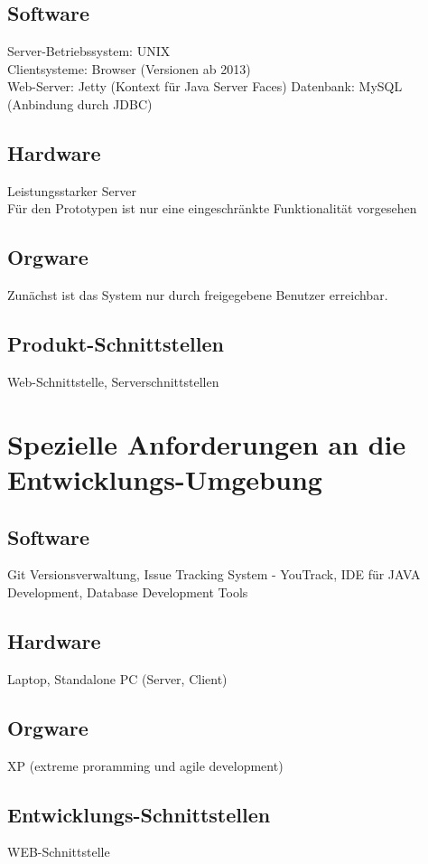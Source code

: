		\subsection{Software}
		Server-Betriebssystem: UNIX\\
		Clientsysteme: Browser (Versionen ab 2013)\\
		Web-Server: Jetty (Kontext für Java Server Faces)
		Datenbank: MySQL (Anbindung durch JDBC)
		
		\subsection{Hardware}
		Leistungsstarker Server\\
		Für den Prototypen ist nur eine eingeschränkte Funktionalität vorgesehen
		
		\subsection{Orgware}
		
		Zunächst ist das System nur durch freigegebene Benutzer erreichbar.		

		\subsection{Produkt-Schnittstellen}
		
		Web-Schnittstelle, Serverschnittstellen
		
	\section{Spezielle Anforderungen an die Entwicklungs-Umgebung}
		\subsection{Software}
		Git Versionsverwaltung, Issue Tracking System - YouTrack, IDE für JAVA Development, Database Development Tools
		
		\subsection{Hardware}
		Laptop, Standalone PC (Server, Client)
		\subsection{Orgware}
		XP (extreme proramming und agile development)	
		\subsection{Entwicklungs-Schnittstellen}
		WEB-Schnittstelle
		

